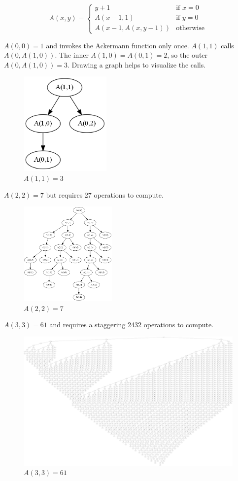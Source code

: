 \documentclass{book}
\begin{document}
\begin{equation*}
A(x,y) =
\begin{cases}
y+1 & \textrm{if } x=0 \\
A(x-1, 1) & \textrm{if } y=0 \\
A(x-1,A(x,y-1)) & \textrm{otherwise}
\end{cases}
\end{equation*}

$A(0,0)=1$ and invokes the Ackermann function only once. $A(1,1)$ calls $A(0, A(1, 0))$. The inner $A(1,0)=A(0,1)=2$, so the outer $A(0,A(1,0))=3$. Drawing a graph helps to visualize the calls.

\begin{figure}[hbhb]
\centering
\includegraphics[height=2in]{ch-recursion/a_1_1_}
\caption{$A(1,1)=3$}
\end{figure}

$A(2,2)=7$ but requires 27 operations to compute.

\begin{figure}[H]
\centering
\includegraphics[height=2in]{ch-recursion/a_2_2_}
\caption{$A(2,2)=7$}
\end{figure}

$A(3,3)=61$ and requires a staggering 2432 operations to compute.

\begin{figure}[H]
\centering
\includegraphics[width=5.5in]{ch-recursion/a_3_3_}
\caption{$A(3,3)=61$}
\end{figure}
\end{document}
